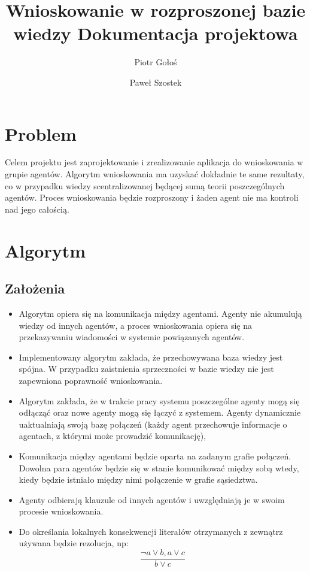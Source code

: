 \documentclass[a4paper,12pt]{mwart}
\title{Wnioskowanie w rozproszonej bazie wiedzy Dokumentacja projektowa}
\author{Piotr Gołoś \and Paweł Szostek}
\begin{document}
\maketitle
\section{Problem}
Celem projektu jest zaprojektowanie i zrealizowanie aplikacja do wnioskowania w grupie agentów. Algorytm wnioskowania ma uzyskać dokładnie te same rezultaty, co w przypadku wiedzy scentralizowanej będącej sumą teorii poszczególnych agentów. Proces wnioskowania będzie rozproszony i żaden agent nie ma kontroli nad jego całością. 

\section{Algorytm}
\subsection{Założenia}
\begin{itemize}
\item Algorytm opiera się na komunikacja między agentami. Agenty nie akumulują wiedzy od innych agentów, a proces wnioskowania opiera się na przekazywaniu wiadomości w systemie powiązanych agentów.
\item Implementowany algorytm zakłada, że przechowywana baza wiedzy jest spójna. W przypadku zaistnienia sprzeczności w bazie wiedzy nie jest zapewniona poprawność wnioskowania.
\item Algorytm zakłada, że w trakcie pracy systemu poszczególne agenty mogą się odłącząć oraz nowe agenty mogą się łączyć z systemem. Agenty dynamicznie uaktualniają swoją bazę połączeń (każdy agent przechowuje informacje o agentach, z którymi może prowadzić komunikację),
\item Komunikacja między agentami będzie oparta na zadanym grafie połączeń. Dowolna para agentów będzie się w stanie komunikować między sobą wtedy, kiedy będzie istniało między nimi połączenie w grafie sąsiedztwa.
\item Agenty odbierają klauzule od innych agentów i uwzględniają je w swoim procesie wnioskowania.
\item Do określania lokalnych konsekwencji literałów otrzymanych z zewnątrz używana będzie rezolucja, np: \begin{equation} \frac{\neg a \vee b, a \vee c}{b \vee c} \end{equation}
\end{itemize}
\end{document}
